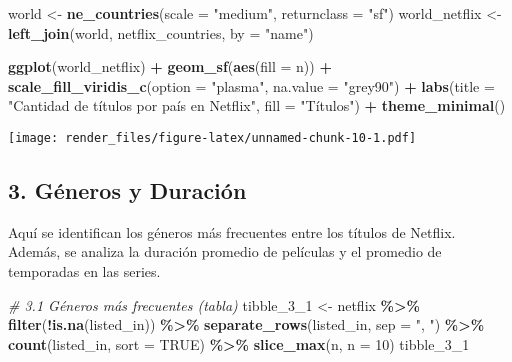 \documentclass[
]{article}
\newenvironment{Shaded}{\begin{snugshade}}{\end{snugshade}}
\newcommand{\AttributeTok}[1]{\textcolor[rgb]{0.13,0.29,0.53}{#1}}
\newcommand{\CommentTok}[1]{\textcolor[rgb]{0.56,0.35,0.01}{\textit{#1}}}
\newcommand{\ConstantTok}[1]{\textcolor[rgb]{0.56,0.35,0.01}{#1}}
\newcommand{\DecValTok}[1]{\textcolor[rgb]{0.00,0.00,0.81}{#1}}
\newcommand{\FunctionTok}[1]{\textcolor[rgb]{0.13,0.29,0.53}{\textbf{#1}}}
\newcommand{\NormalTok}[1]{#1}
\newcommand{\OtherTok}[1]{\textcolor[rgb]{0.56,0.35,0.01}{#1}}
\newcommand{\SpecialCharTok}[1]{\textcolor[rgb]{0.81,0.36,0.00}{\textbf{#1}}}
\newcommand{\StringTok}[1]{\textcolor[rgb]{0.31,0.60,0.02}{#1}}
\begin{document}
\begin{Shaded}
\begin{Highlighting}[]
\NormalTok{world }\OtherTok{\textless{}{-}} \FunctionTok{ne\_countries}\NormalTok{(}\AttributeTok{scale =} \StringTok{"medium"}\NormalTok{, }\AttributeTok{returnclass =} \StringTok{"sf"}\NormalTok{)}
\NormalTok{world\_netflix }\OtherTok{\textless{}{-}} \FunctionTok{left\_join}\NormalTok{(world, netflix\_countries, }\AttributeTok{by =} \StringTok{"name"}\NormalTok{)}

\FunctionTok{ggplot}\NormalTok{(world\_netflix) }\SpecialCharTok{+}
  \FunctionTok{geom\_sf}\NormalTok{(}\FunctionTok{aes}\NormalTok{(}\AttributeTok{fill =}\NormalTok{ n)) }\SpecialCharTok{+}
  \FunctionTok{scale\_fill\_viridis\_c}\NormalTok{(}\AttributeTok{option =} \StringTok{"plasma"}\NormalTok{, }\AttributeTok{na.value =} \StringTok{"grey90"}\NormalTok{) }\SpecialCharTok{+}
  \FunctionTok{labs}\NormalTok{(}\AttributeTok{title =} \StringTok{"Cantidad de títulos por país en Netflix"}\NormalTok{,}
       \AttributeTok{fill =} \StringTok{"Títulos"}\NormalTok{) }\SpecialCharTok{+}
  \FunctionTok{theme\_minimal}\NormalTok{()}
\end{Highlighting}
\end{Shaded}

\texttt{[image: render\_files/figure-latex/unnamed-chunk-10-1.pdf]}

\subsection{3. Géneros y Duración}\label{guxe9neros-y-duraciuxf3n}

Aquí se identifican los géneros más frecuentes entre los títulos de
Netflix. Además, se analiza la duración promedio de películas y el
promedio de temporadas en las series.

\begin{Shaded}
\begin{Highlighting}[]
\CommentTok{\# 3.1 Géneros más frecuentes (tabla)}
\NormalTok{tibble\_3\_1 }\OtherTok{\textless{}{-}}\NormalTok{ netflix }\SpecialCharTok{\%\textgreater{}\%}
  \FunctionTok{filter}\NormalTok{(}\SpecialCharTok{!}\FunctionTok{is.na}\NormalTok{(listed\_in)) }\SpecialCharTok{\%\textgreater{}\%}
  \FunctionTok{separate\_rows}\NormalTok{(listed\_in, }\AttributeTok{sep =} \StringTok{", "}\NormalTok{) }\SpecialCharTok{\%\textgreater{}\%}
  \FunctionTok{count}\NormalTok{(listed\_in, }\AttributeTok{sort =} \ConstantTok{TRUE}\NormalTok{) }\SpecialCharTok{\%\textgreater{}\%}
  \FunctionTok{slice\_max}\NormalTok{(n, }\AttributeTok{n =} \DecValTok{10}\NormalTok{)}
\NormalTok{tibble\_3\_1}
\end{Highlighting}
\end{Shaded}
\end{document}
